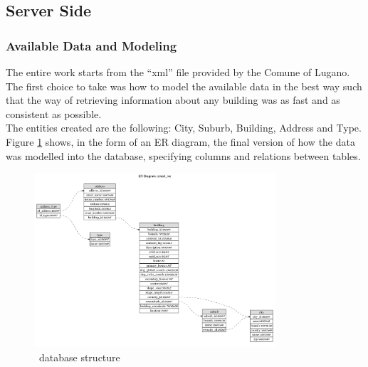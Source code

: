 \subsection{Server Side}
\subsubsection{Available Data and Modeling}
The entire work starts from the ``xml'' file provided by the Comune of Lugano. The first choice to take was how to model the available data in the best way such that the way of retrieving information about any building was as fast and as consistent as possible.\\
The entities created are the following: City, Suburb, Building, Address and Type. Figure \ref{fig:db_structure} shows, in the form of an ER diagram, the final version of how the data was modelled into the database, specifying columns and relations between tables.
\begin{figure}[H]
\centering
\includegraphics[width=0.8\textwidth]{chapter3/images/db_structure}
\caption{\applicationName\ database structure}
\label{fig:db_structure}
\end{figure}
